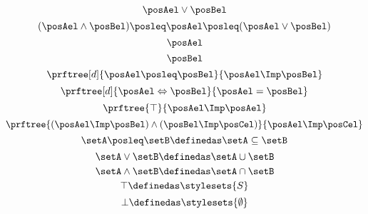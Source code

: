 {\begin{forslides}
        \begin{equation*}
        \label{eq:latt_2}
        \posAel \vee \posBel
\end{equation*}
            \begin{equation*}
        \label{eq:latt_3}
        (\posAel \wedge \posBel)\posleq \posAel \posleq (\posAel \vee \posBel)
\end{equation*}
        \begin{equation*}
        \label{eq:latt_4}
        \posAel
\end{equation*}
        \begin{equation*}
        \label{eq:latt_5}
        \posBel
\end{equation*}
    \begin{equation*}
        \label{eq:prop_1}
        \prftree[d]{\posAel \posleq \posBel}{\posAel \Imp \posBel}
\end{equation*}
        \begin{equation*}
        \label{eq:prop_2}
        \prftree[d]{\posAel \Leftrightarrow \posBel}{\posAel = \posBel}
\end{equation*}
        \begin{equation*}
        \label{eq:prop_3}
        \prftree{\top}{\posAel \Imp \posAel}
\end{equation*}
        \begin{equation*}
        \label{eq:prop_4}
        \prftree{(\posAel \Imp \posBel)\wedge (\posBel \Imp \posCel)}{\posAel \Imp \posCel}
\end{equation*}
    \begin{equation*}
        \label{eq:pow_1}
        \setA \posleq \setB \definedas \setA \subseteq \setB
\end{equation*}
        \begin{equation*}
        \label{eq:pow_2}
        \setA \vee \setB \definedas \setA \cup \setB
\end{equation*}
            \begin{equation*}
        \label{eq:pow_3}
        \setA \wedge \setB \definedas \setA \cap \setB
\end{equation*}
            \begin{equation*}
        \label{eq:pow_4}
        \top \definedas \stylesets{S}
\end{equation*}
                \begin{equation*}
        \label{eq:pow_5}
        \bot \definedas \stylesets{\emptyset}
\end{equation*}

\end{forslides}}
